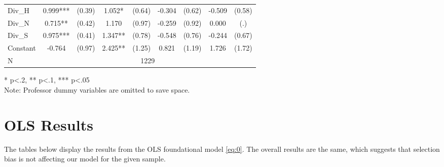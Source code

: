 \begin{sidewaystable}[htb]
\begin{threeparttable}
\begin{tabular}{l|c|c|c|c|c|c|c|c}
      Div\_H            & 0.999***                     & (0.39)                       & 1.052*                      & (0.64)               & -0.304               & (0.62)               & -0.509               & (0.58)               \\
      Div\_N            & 0.715**                      & (0.42)                       & 1.170                       & (0.97)               & -0.259               & (0.92)               & 0.000                & (.)                  \\
      Div\_S            & 0.975***                     & (0.41)                       & 1.347**                     & (0.78)               & -0.548               & (0.76)               & -0.244               & (0.67)               \\
      Constant          & -0.764                       & (0.97)                       & 2.425**                     & (1.25)               & 0.821                & (1.19)               & 1.726                & (1.72)               \\      
      \hline
      N & \multicolumn{8}{|c}{1229} \\
      \hline
      \hline
    \end{tabular}
    \begin{tablenotes}
    \item{* p<.2, ** p<.1, *** p<.05 \\ Note: Professor dummy variables are omitted to save space.}
    \end{tablenotes}
  \end{threeparttable}
\end{sidewaystable}

\clearpage{}

\section{OLS Results}\label{appendix:c}

The tables below display the results from the OLS foundational model \eqref{eq:0}. 
The overall results are the same, which suggests that selection bias is not affecting our model for the given sample.


